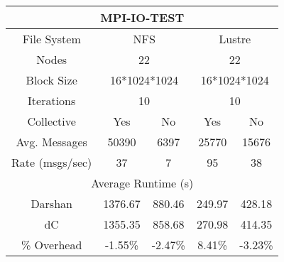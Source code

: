 \begin{table}[h]
    \begin{subtable}[h]{0.5\textwidth}
    \vspace{0.5cm}
        \centering
        \setlength\tabcolsep{8pt}
       \begin{tabular}{|ccccc|}
        \hline
        \multicolumn{5}{|c|}{MPI-IO-TEST}                                                                                                              \\ \hline
        \multicolumn{1}{|c|}{File System}        & \multicolumn{2}{c|}{NFS}                                    & \multicolumn{2}{c|}{Lustre}           \\ \hline
        \multicolumn{1}{|c|}{Nodes}              & \multicolumn{2}{c|}{22}                                     & \multicolumn{2}{c|}{22}               \\ \hline
        \multicolumn{1}{|c|}{Block Size}         & \multicolumn{2}{c|}{16*1024*1024}                           & \multicolumn{2}{c|}{16*1024*1024}     \\ \hline
        \multicolumn{1}{|c|}{Iterations}         & \multicolumn{2}{c|}{10}                                     & \multicolumn{2}{c|}{10}               \\ \hline
        \multicolumn{1}{|c|}{Collective}         & \multicolumn{1}{c|}{Yes}     & \multicolumn{1}{c|}{No}      & \multicolumn{1}{c|}{Yes}    & No      \\ \hline
        \multicolumn{1}{|c|}{Avg. Messages}      & \multicolumn{1}{c|}{50390}   & \multicolumn{1}{c|}{6397}    & \multicolumn{1}{c|}{25770}  & 15676   \\ \hline
        \multicolumn{1}{|c|}{Rate (msgs/sec)} & \multicolumn{1}{c|}{37}      & \multicolumn{1}{c|}{7}       & \multicolumn{1}{c|}{95}     & 38      \\ \hline
        \multicolumn{5}{|c|}{Average Runtime (s)}                                                                                                      \\ \hline
        \multicolumn{1}{|c|}{Darshan}            & \multicolumn{1}{c|}{1376.67} & \multicolumn{1}{c|}{880.46}  & \multicolumn{1}{c|}{249.97} & 428.18  \\ \hline
        \multicolumn{1}{|c|}{dC}                 & \multicolumn{1}{c|}{1355.35} & \multicolumn{1}{c|}{858.68}  & \multicolumn{1}{c|}{270.98} & 414.35  \\ \hline
        \multicolumn{1}{|c|}{\% Overhead}        & \multicolumn{1}{c|}{-1.55\%} & \multicolumn{1}{c|}{-2.47\%} & \multicolumn{1}{c|}{8.41\%} & -3.23\% \\ \hline

\end{tabular}
\end{subtable}
\end{table}

